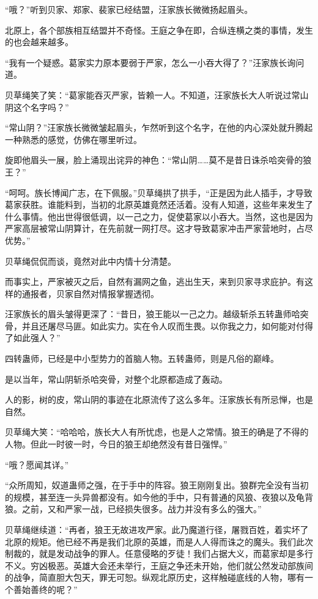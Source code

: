 
\begin{this_body}



“哦？”听到贝家、郑家、裴家已经结盟，汪家族长微微扬起眉头。

北原上，各个部族相互结盟并不奇怪。王庭之争在即，合纵连横之类的事情，发生的也会越来越多。

“我有一个疑惑。葛家实力原本要弱于严家，怎么一小吞大得了？”汪家族长询问道。

贝草绳笑了笑：“葛家能吞灭严家，皆赖一人。不知道，汪家族长大人听说过常山阴这个名字吗？”

“常山阴？”汪家族长微微皱起眉头，乍然听到这个名字，在他的内心深处就升腾起一种熟悉的感觉，仿佛在哪里听过。

旋即他眉头一展，脸上涌现出诧异的神色：“常山阴……莫不是昔日诛杀哈突骨的狼王？”

“呵呵。族长博闻广志，在下佩服。”贝草绳拱了拱手，“正是因为此人插手，才导致葛家获胜。谁能料到，当初的北原英雄竟然还活着。没有人知道，这些年来发生了什么事情。他出世得很低调，以一己之力，促使葛家以小吞大。当然，这也是因为严家高层被常山阴算计，在先前就一网打尽。这才导致葛家冲击严家营地时，占尽优势。”

贝草绳侃侃而谈，竟然对此中内情十分清楚。

而事实上，严家被灭之后，自然有漏网之鱼，逃出生天，来到贝家寻求庇护。有这样的通报者，贝家自然对情报掌握透彻。

汪家族长的眉头皱得更深了：“昔日，狼王能以一己之力。越级斩杀五转蛊师哈突骨，并且还屠尽马匪。如此实力。实在令人叹而生畏。以你我之力，如何能对付得了如此强人？”

四转蛊师，已经是中小型势力的首脑人物。五转蛊师，则是凡俗的巅峰。

是以当年，常山阴斩杀哈突骨，对整个北原都造成了轰动。

人的影，树的皮，常山阴的事迹在北原流传了这么多年。汪家族长有所忌惮，也是自然。

贝草绳大笑：“哈哈哈，族长大人有所忧虑，也是人之常情。狼王的确是了不得的人物。但此一时彼一时，今日的狼王却绝然没有昔日强悍。”

“哦？愿闻其详。”

“众所周知，奴道蛊师之强，在于手中的阵容。狼王刚刚复出。狼群完全没有当初的规模，甚至连一头异兽都没有。如今他的手中，只有普通的风狼、夜狼以及龟背狼。之前，又和严家一战，已经损失很多。战力并没有多么的强大。”

贝草绳继续道：“再者，狼王无故进攻严家。此乃魔道行径，屠戮百姓，着实坏了北原的规矩。他已经不再是我们北原的英雄，而是人人得而诛之的魔头。我们此次制裁的，就是发动战争的罪人。任意侵略的歹徒！我们占据大义，而葛家却是多行不义。穷凶极恶。英雄大会还未举行，王庭之争还未开始，他们就公然发动部族间的战争，简直胆大包天，罪无可恕。纵观北原历史，这样触碰底线的人物，哪有一个善始善终的呢？”


\end{this_body}
